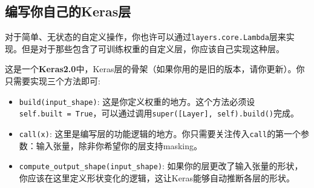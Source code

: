 
\subsection{编写你自己的Keras层}\label{ux7f16ux5199ux4f60ux81eaux5df1ux7684kerasux5c42}

对于简单、无状态的自定义操作，你也许可以通过\texttt{layers.core.Lambda}层来实现。但是对于那些包含了可训练权重的自定义层，你应该自己实现这种层。

这是一个\textbf{Keras2.0}中，Keras层的骨架（如果你用的是旧的版本，请你更新）。你只需要实现三个方法即可:

\begin{itemize}
\tightlist
\item
  \texttt{build(input\_shape)}:
  这是你定义权重的地方。这个方法必须设\texttt{self.built\ =\ True}，可以通过调用\texttt{super({[}Layer{]},\ self).build()}完成。
\item
  \texttt{call(x)}:
  这里是编写层的功能逻辑的地方。你只需要关注传入\texttt{call}的第一个参数：输入张量，除非你希望你的层支持masking。
\item
  \texttt{compute\_output\_shape(input\_shape)}:
  如果你的层更改了输入张量的形状，你应该在这里定义形状变化的逻辑，这让Keras能够自动推断各层的形状。
\end{itemize}

